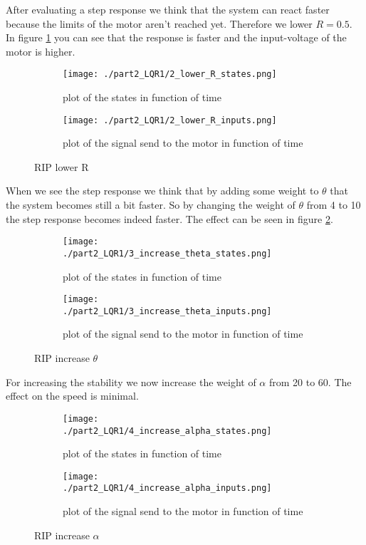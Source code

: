 After evaluating a step response we think that the system can react faster because the limits of the motor aren't reached yet. Therefore we lower $ R = 0.5$. In figure \ref{fig:lowR} you can see that the response is faster and the input-voltage of the motor is higher.

\begin{figure}[H]
	\centering
	\begin{subfigure}[b]{0.45\textwidth}
		\texttt{[image: ./part2\_LQR1/2\_lower\_R\_states.png]}
		\caption{plot of the states in function of time}
	\end{subfigure}
	\begin{subfigure}[b]{0.45\textwidth}
		\texttt{[image: ./part2\_LQR1/2\_lower\_R\_inputs.png]}
		\caption{plot of the signal send to the motor in function of time}
	\end{subfigure}
	\caption{RIP lower R}
	\label{fig:lowR}
\end{figure}

When we see the step response we think that by adding some weight to $\theta$ that the system becomes still a bit faster. So by changing the weight of $\theta$ from 4 to 10 the step response becomes indeed faster. The effect can be seen in figure \ref{fig:heighT}.

\begin{figure}[H]
	\centering
	\begin{subfigure}[b]{0.45\textwidth}
		\texttt{[image: ./part2\_LQR1/3\_increase\_theta\_states.png]}
		\caption{plot of the states in function of time}
	\end{subfigure}
	\begin{subfigure}[b]{0.45\textwidth}
		\texttt{[image: ./part2\_LQR1/3\_increase\_theta\_inputs.png]}
		\caption{plot of the signal send to the motor in function of time}
	\end{subfigure}
	\caption{RIP increase $\theta$}
	\label{fig:heighT}
\end{figure}

For increasing the stability we now increase the weight of $\alpha$ from 20 to 60. The effect on the speed is minimal.

\begin{figure}[H]
	\centering
	\begin{subfigure}[b]{0.45\textwidth}
		\texttt{[image: ./part2\_LQR1/4\_increase\_alpha\_states.png]}
		\caption{plot of the states in function of time}
	\end{subfigure}
	\begin{subfigure}[b]{0.45\textwidth}
		\texttt{[image: ./part2\_LQR1/4\_increase\_alpha\_inputs.png]}
		\caption{plot of the signal send to the motor in function of time}
	\end{subfigure}
	\caption{RIP increase $\alpha$}
\end{figure}

